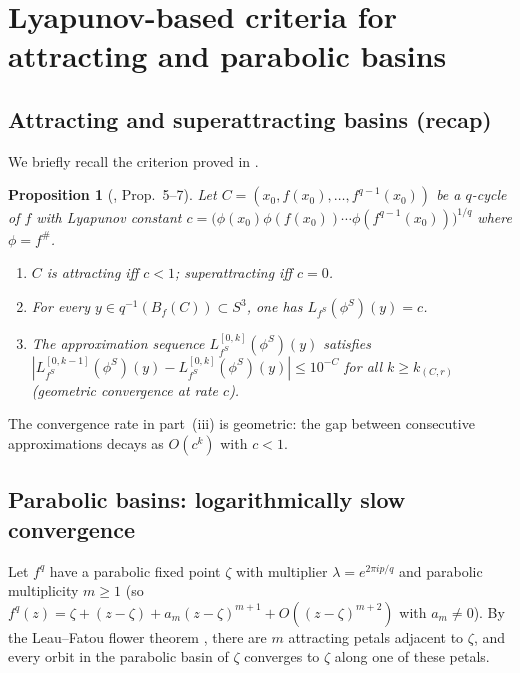 \documentclass[12pt]{article}
\newtheorem{proposition}[theorem]{Proposition}
\theoremstyle{definition}
\newcommand{\fsh}{f^{\#}}            %
\begin{document}
\section{Lyapunov-based criteria for attracting and parabolic basins}
\label{sec:lyapunov}

\subsection{Attracting and superattracting basins (recap)}

We briefly recall the criterion proved in \cite{Alvarez2023}.

\begin{proposition}[\cite{Alvarez2023}, Prop.~5--7]\label{prop:attracting}
  Let $C = (x_0, f(x_0), \ldots, f^{q-1}(x_0))$ be a $q$-cycle of $f$
  with Lyapunov constant
  $c = \bigl(\phi(x_0)\phi(f(x_0))\cdots\phi(f^{q-1}(x_0))\bigr)^{1/q}$
  where $\phi = \fsh$.
  \begin{enumerate}[label=(\roman*)]
    \item $C$ is attracting iff $c < 1$; superattracting iff $c = 0$.
    \item For every $y \in q^{-1}(B_f(C)) \subset S^3$, one has
          $L_{f^S}(\phi^S)(y) = c$.
    \item The approximation sequence $L_{f^S}^{[0,k]}(\phi^S)(y)$
          satisfies $|L_{f^S}^{[0,k-1]}(\phi^S)(y) -
          L_{f^S}^{[0,k]}(\phi^S)(y)| \leq 10^{-C}$
          for all $k \ge k_{(C,r)}$ (geometric convergence at rate $c$).
  \end{enumerate}
\end{proposition}

The convergence rate in part~(iii) is geometric: the gap between
consecutive approximations decays as $O(c^k)$ with $c < 1$.

\subsection{Parabolic basins: logarithmically slow convergence}

Let $f^q$ have a parabolic fixed point $\zeta$ with multiplier
$\lambda = e^{2\pi ip/q}$ and parabolic multiplicity $m \ge 1$ (so
$f^q(z) = \zeta + (z-\zeta) + a_m(z-\zeta)^{m+1} + O((z-\zeta)^{m+2})$
with $a_m \ne 0$).  By the Leau--Fatou flower theorem \cite{Milnor2006},
there are $m$ attracting petals adjacent to $\zeta$, and every orbit in the
parabolic basin of $\zeta$ converges to $\zeta$ along one of these petals.
\end{document}
